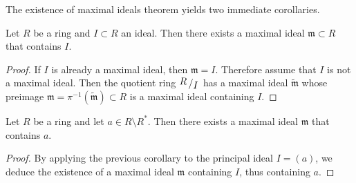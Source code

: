 The existence of maximal ideals theorem yields two immediate corollaries.

\begin{theorem}
	Let $R$ be a ring and $I \subset R$ an ideal. Then there exists a maximal ideal $\mathfrak{m} \subset R$ that contains $I$.
\end{theorem}
\begin{proof}
	If $I$ is already a maximal ideal, then $\mathfrak{m} = I$. Therefore assume that $I$ is not a maximal ideal. Then the quotient ring $\quotient{R}{I}$ has a maximal ideal $\tilde{\mathfrak{m}}$ whose preimage $\mathfrak{m} = \pi^{-1}(\tilde{\mathfrak{m}}) \subset R$ is a maximal ideal containing $I$.
\end{proof}

\begin{col}
	Let $R$ be a ring and let $a \in R \setminus R^\ast$. Then there exists a maximal ideal $\mathfrak{m}$ that contains $a$.
\end{col}
\begin{proof}
	By applying the previous corollary to the principal ideal $I = (a)$, we deduce the existence of a maximal ideal $\mathfrak{m}$ containing $I$, thus containing $a$. 
\end{proof}





